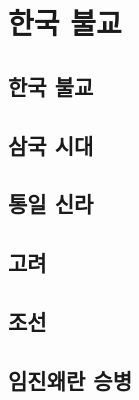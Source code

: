 \documentclass[12pt, a4paper, oneside]{book}
\let\stdsection\section
\renewcommand\section{\newpage\stdsection}
\begin{document}
	\chapter{ 한국 불교 }
	\noptcrule

	\newpage	
	\minitoc


%
	\section{ 한국 불교 }


%
	\section{ 삼국 시대 }


%
	\section{ 통일 신라 }


%
	\section{ 고려 }


%
	\section{ 조선 }


%
	\section{ 임진왜란 승병 }
\end{document}
